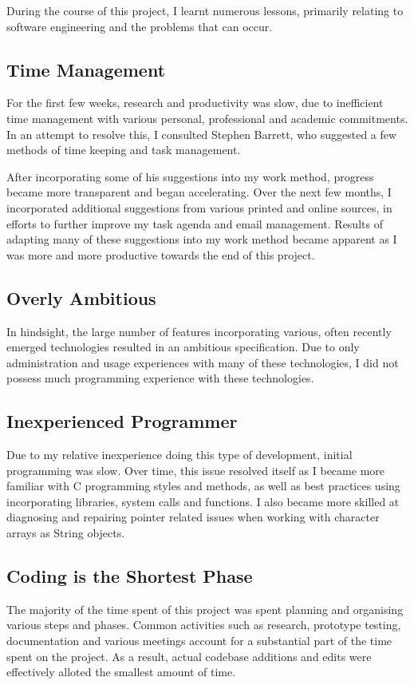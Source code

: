 
During the course of this project, I learnt numerous lessons, primarily
relating to software engineering and the problems that can occur.

\subsection{Time Management}

For the first few weeks, research and productivity was slow, due to
inefficient time management with various personal, professional and
academic commitments. In an attempt to resolve this, I consulted
Stephen Barrett, who suggested a few methods of time keeping and task
management.


After incorporating some of his suggestions into my work method,
progress became more transparent and began accelerating. Over the next
few months, I incorporated additional suggestions from various printed
and online sources, in efforts to further improve my task agenda and 
email management. Results of adapting many of these suggestions into my
work method became apparent as I was more and more productive towards
the end of this project.

\subsection{Overly Ambitious}

In hindsight, the large number of features incorporating various, often
recently emerged technologies resulted in an ambitious specification.
Due to only administration and usage experiences with many of these
technologies, I did not possess much  programming experience with these
technologies. 

\subsection{Inexperienced Programmer}

Due to my relative inexperience doing this type of development, initial
programming was slow. Over time, this issue resolved itself as I became
more familiar with C programming styles and methods, as well as best
practices using incorporating libraries, system calls and functions. I
also became more skilled at diagnosing and repairing pointer related 
issues when working with character arrays as String objects.

\subsection{Coding is the Shortest Phase}

The majority of the time spent of this project was spent planning and
organising various steps and phases. Common activities such as research,
prototype testing, documentation and various meetings account for a 
substantial part of the time spent on the project. As a result, actual 
codebase additions and edits were effectively alloted the smallest 
amount of time.

